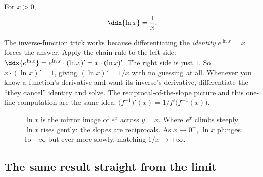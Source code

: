 \begin{theorem}
\label{ch12:thm-ln}
For $x>0$,
\[
   \ddx{\ln x} = \frac{1}{x}.
\]
\end{theorem}

\begin{whybox}
The inverse-function trick works because differentiating the
\emph{identity} $e^{\ln x}=x$ forces the answer. Apply the chain rule to the
left side: $\ddx{e^{\ln x}} = e^{\ln x}\cdot(\ln x)' = x\cdot(\ln x)'$. The
right side is just $1$. So $x\cdot(\ln x)' = 1$, giving $(\ln x)' = 1/x$
with no guessing at all. Whenever you know a function's derivative and want
its inverse's derivative, differentiate the ``they cancel'' identity and
solve. The reciprocal-of-the-slope picture and this one-line computation are
the same idea: $\big(f^{-1}\big)'(x) = 1/f'\!\big(f^{-1}(x)\big)$.
\end{whybox}

\begin{figure}[H]
\centering
{}
\caption{$\ln x$ is the mirror image of $e^x$ across $y=x$. Where $e^x$
climbs steeply, $\ln x$ rises gently: the slopes are reciprocals. As
$x\to 0^+$, $\ln x$ plunges to $-\infty$ but ever more slowly, matching
$1/x\to+\infty$.}
\label{ch12:fig-ln-reflection}
\end{figure}

\subsection{The same result straight from the limit}

